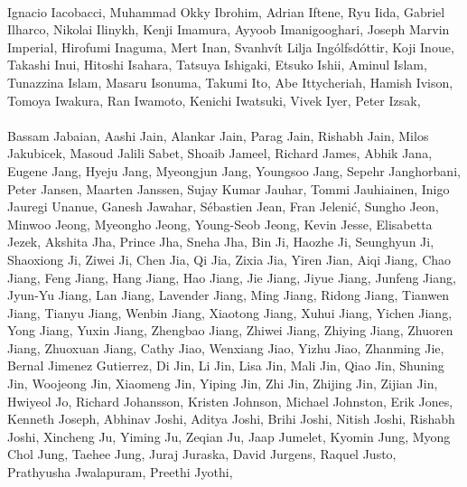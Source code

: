 \paragraph{}Ignacio Iacobacci, Muhammad Okky Ibrohim, Adrian Iftene, Ryu Iida, Gabriel Ilharco, Nikolai Ilinykh, Kenji Imamura, Ayyoob Imanigooghari, Joseph Marvin Imperial, Hirofumi Inaguma, Mert Inan, Svanhvít Lilja Ingólfsdóttir, Koji Inoue, Takashi Inui, Hitoshi Isahara, Tatsuya Ishigaki, Etsuko Ishii, Aminul Islam, Tunazzina Islam, Masaru Isonuma, Takumi Ito, Abe Ittycheriah, Hamish Ivison, Tomoya Iwakura, Ran Iwamoto, Kenichi Iwatsuki, Vivek Iyer, Peter Izsak,
\paragraph{}Bassam Jabaian, Aashi Jain, Alankar Jain, Parag Jain, Rishabh Jain, Milos Jakubicek, Masoud Jalili Sabet, Shoaib Jameel, Richard James, Abhik Jana, Eugene Jang, Hyeju Jang, Myeongjun Jang, Youngsoo Jang, Sepehr Janghorbani, Peter Jansen, Maarten Janssen, Sujay Kumar Jauhar, Tommi Jauhiainen, Inigo Jauregi Unanue, Ganesh Jawahar, Sébastien Jean, Fran Jelenić, Sungho Jeon, Minwoo Jeong, Myeongho Jeong, Young-Seob Jeong, Kevin Jesse, Elisabetta Jezek, Akshita Jha, Prince Jha, Sneha Jha, Bin Ji, Haozhe Ji, Seunghyun Ji, Shaoxiong Ji, Ziwei Ji, Chen Jia, Qi Jia, Zixia Jia, Yiren Jian, Aiqi Jiang, Chao Jiang, Feng Jiang, Hang Jiang, Hao Jiang, Jie Jiang, Jiyue Jiang, Junfeng Jiang, Jyun-Yu Jiang, Lan Jiang, Lavender Jiang, Ming Jiang, Ridong Jiang, Tianwen Jiang, Tianyu Jiang, Wenbin Jiang, Xiaotong Jiang, Xuhui Jiang, Yichen Jiang, Yong Jiang, Yuxin Jiang, Zhengbao Jiang, Zhiwei Jiang, Zhiying Jiang, Zhuoren Jiang, Zhuoxuan Jiang, Cathy Jiao, Wenxiang Jiao, Yizhu Jiao, Zhanming Jie, Bernal Jimenez Gutierrez, Di Jin, Li Jin, Lisa Jin, Mali Jin, Qiao Jin, Shuning Jin, Woojeong Jin, Xiaomeng Jin, Yiping Jin, Zhi Jin, Zhijing Jin, Zijian Jin, Hwiyeol Jo, Richard Johansson, Kristen Johnson, Michael Johnston, Erik Jones, Kenneth Joseph, Abhinav Joshi, Aditya Joshi, Brihi Joshi, Nitish Joshi, Rishabh Joshi, Xincheng Ju, Yiming Ju, Zeqian Ju, Jaap Jumelet, Kyomin Jung, Myong Chol Jung, Taehee Jung, Juraj Juraska, David Jurgens, Raquel Justo, Prathyusha Jwalapuram, Preethi Jyothi,
